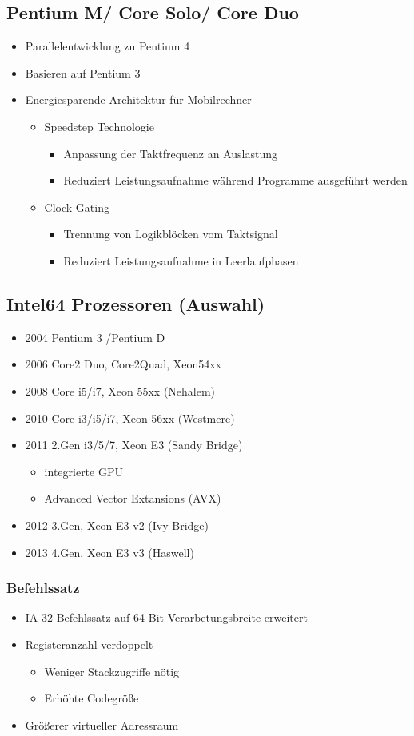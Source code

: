 \subsection{Pentium M/ Core Solo/ Core Duo}
\begin{itemize}
	\item Parallelentwicklung zu Pentium 4
	\item Basieren auf Pentium 3
	\item Energiesparende Architektur für Mobilrechner
	\begin{itemize}
		\item Speedstep Technologie
		\begin{itemize}
			\item Anpassung der Taktfrequenz an Auslastung
			\item Reduziert Leistungsaufnahme während Programme ausgeführt werden
		\end{itemize}
		\item Clock Gating
		\begin{itemize}
			\item Trennung von Logikblöcken vom Taktsignal
			\item Reduziert Leistungsaufnahme in Leerlaufphasen
		\end{itemize}
	\end{itemize}
\end{itemize}
\subsection{Intel64 Prozessoren (Auswahl)}
\begin{itemize}
	\item 2004 Pentium 3 /Pentium D
	\item 2006 Core2 Duo, Core2Quad, Xeon54xx
	\item 2008 Core i5/i7, Xeon 55xx (Nehalem)
	\item 2010 Core i3/i5/i7, Xeon 56xx (Westmere)
	\item 2011 2.Gen i3/5/7, Xeon E3 (Sandy Bridge)
	\begin{itemize}
		\item integrierte GPU
		\item Advanced Vector Extansions (AVX)
	\end{itemize}
	\item 2012 3.Gen, Xeon E3 v2 (Ivy Bridge)
	\item 2013 4.Gen, Xeon E3 v3 (Haswell)
\end{itemize}
\subsubsection{Befehlssatz}
\begin{itemize}
	\item IA-32 Befehlssatz auf 64 Bit Verarbetungsbreite erweitert
	\item Registeranzahl verdoppelt
	\begin{itemize}
		\item Weniger Stackzugriffe nötig
		\item Erhöhte Codegröße
	\end{itemize}
	\item Größerer virtueller Adressraum
\end{itemize}
